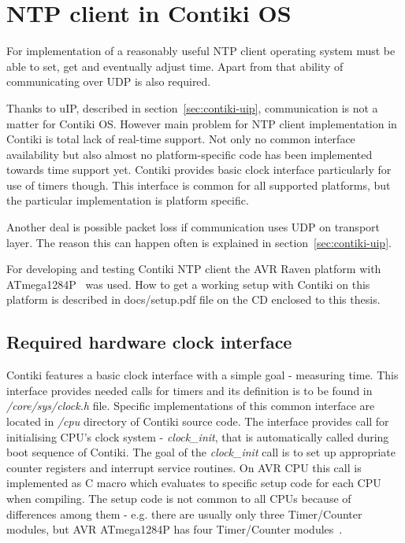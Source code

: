 
\chapter{NTP client in Contiki OS}
For implementation of a reasonably useful NTP client
operating system must be able to set, get
and eventually adjust time.
Apart from that ability of communicating over UDP is also required.

Thanks to uIP, described in section~\ref{sec:contiki-uip}, communication is
not a matter for Contiki OS.
However main problem for NTP client implementation in Contiki is total
lack of real-time support.
Not only no common interface availability but also
almost no platform-specific code has been implemented towards time support yet.
Contiki provides basic clock interface particularly for use of timers though.
This interface is common for all supported platforms,
but the particular implementation is platform specific.

Another deal is possible packet loss if communication uses UDP on transport layer.
The reason this can happen often is explained in section~\ref{sec:contiki-uip}.

For developing and testing Contiki NTP client the AVR Raven platform with ATmega1284P~\cite{avr-datasheet} was used.
How to get a working setup with Contiki on this platform is described in
docs/setup.pdf file on the CD enclosed to this thesis.

\section{Required hardware clock interface}
Contiki features a basic clock interface with a simple goal - measuring time.
This interface provides needed calls for timers and its definition is to be found in {\it{/core/sys/clock.h}} file.
Specific implementations of this common interface are located in {\it{/cpu}} directory of Contiki source code.
The interface provides call for initialising CPU's clock system - {\it{clock\_init}}, that is automatically called during
boot sequence of Contiki.
The goal of the {\it{clock\_init}} call is to set up
appropriate counter registers and interrupt service routines. %
On AVR CPU this call is implemented as C macro which evaluates to specific setup code for each CPU
when compiling.
The setup code is not common to all CPUs because of differences among them - e.g. there are usually
only three Timer/Counter modules, but AVR ATmega1284P has four Timer/Counter modules~\cite{avr-datasheet}.

